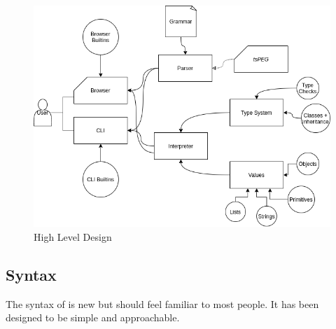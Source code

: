 \begin{figure}
    \caption{\Setanta{} High Level Design}
    \label{setantadiagram}
    \begin{center}
    \includegraphics[scale=0.5]{setantadiagram}
    \end{center}
\end{figure}

\subsection{Syntax}

The syntax of \Setanta{} is new but should feel familiar to most people. It has been designed to be simple and approachable.

